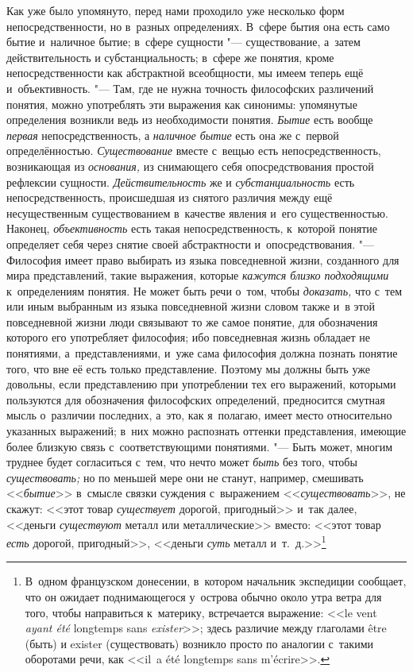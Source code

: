 Как уже было упомянуто, перед нами проходило уже несколько
форм непосредственности, но в~разных определениях. В~сфере бытия она есть
само бытие и~наличное бытие; в~сфере сущности
"--- существование, а~затем действительность и
субстанциальность; в~сфере же понятия, кроме непосредственности как
абстрактной всеобщности, мы имеем теперь ещё и~объективность. "---
Там, где не нужна точность философских различений понятия,
можно употреблять эти выражения как синонимы: упомянутые определения
возникли ведь из необходимости понятия. {\em Бытие} есть вообще
{\em первая} непосредственность, а {\em наличное бытие} есть
она же с~первой определённостью. {\em Существование}
вместе с~вещью есть непосредственность, возникающая из {\em основания,} из
снимающего себя опосредствования простой рефлексии сущности.
{\em Действительность} же и {\em субстанциальность}
есть непосредственность, происшедшая из снятого различия
между ещё несущественным существованием в~качестве явления и~его
существенностью. Наконец, {\em объективность} есть
такая непосредственность, к~которой понятие определяет себя через снятие
своей абстрактности и~опосредствования. "--- Философия имеет
право выбирать из языка повседневной жизни, созданного для мира
представлений, такие выражения, которые {\em кажутся близко подходящими}
к~определениям понятия. Не может быть речи о~том, чтобы {\em доказать,} что
с~тем или иным выбранным из языка повседневной жизни словом также и~в этой
повседневной жизни люди связывают то же самое понятие, для обозначения
которого его употребляет философия; ибо повседневная жизнь
обладает не понятиями, а~представлениями, и~уже сама философия должна
познать понятие того, что вне её есть только представление. Поэтому мы
должны быть уже довольны, если представлению при употреблении тех его
выражений, которыми пользуются для обозначения философских определений,
предносится смутная мысль о~различии последних, а~это, как я~полагаю, имеет
место относительно указанных выражений; в~них можно распознать оттенки
представления, имеющие более близкую связь с~соответствующими понятиями. "---
Быть может, многим труднее будет согласиться с~тем, что нечто
может {\em быть} без того, чтобы {\em существовать;}
но по меньшей мере они не станут, например, смешивать <<{\em бытие}>>
в~смысле связки суждения с~выражением <<{\em существовать}>>, не
скажут: <<этот товар {\em существует}
дорогой, пригодный>> и~так далее, <<деньги {\em существуют} металл
или металлические>> вместо: <<этот товар {\em есть} дорогой,
пригодный>>, <<деньги {\em суть} металл и~т.~д.>>\footnote{В~одном
французском донесении, в~котором начальник экспедиции
сообщает, что он ожидает поднимающегося у~острова обычно около утра ветра
для того, чтобы направиться к~материку, встречается выражение: <<le vent
{\em ayant été} longtemps sans
{\em exister}>>\label{bkm:bm64};
здесь различие между глаголами être (быть) и
exister (существовать) возникло просто по аналогии с~такими
оборотами речи, как <<il~a été longtemps sans
m'écrire>>.}
